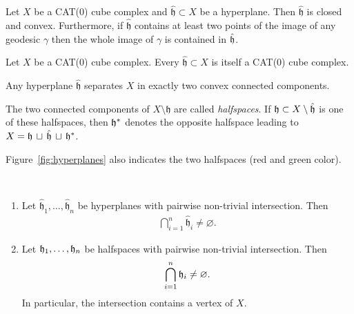\begin{prop}
  Let \(X\) be a CAT(0) cube complex and \(\mathfrak{\hat h} \subset X\) be a hyperplane. Then \(\mathfrak{\hat h}\) is closed and convex. Furthermore, if \(\mathfrak{\hat h}\) contains at least two points of the image of any geodesic \(\gamma\) then the whole image of \(\gamma\) is contained in \(\mathfrak{\hat h}\).
\end{prop}

\begin{cor}
  Let \(X\) be a CAT(0) cube complex. Every \(\mathfrak{\hat h} \subset X\) is itself a CAT(0) cube complex.
\end{cor}

\begin{thm}
  Any hyperplane \(\mathfrak{\hat h}\) separates \(X\) in exactly two convex connected components.
\end{thm}

\begin{defin}[Halfspaces]
  The two connected components of \(X \setminus \mathfrak{h}\) are called \emph{halfspaces}. If \(\mathfrak{h} \subset X \setminus \mathfrak{\hat h}\) is one of these halfspaces, then \(\mathfrak{h}^\ast\) denotes the opposite halfspace leading to \(X = \mathfrak{h}\, \sqcup\, \mathfrak{\hat h}\, \sqcup\, \mathfrak{h}^\ast \).
\end{defin}

\begin{bsp}
  Figure~\ref{fig:hyperplanes} also indicates the two halfspaces (red and green color).
\end{bsp}

\begin{thm}~\vspace{-6pt}
  \label{thm:common-intersection}
  \begin{enumerate} 
  \item Let \(\mathfrak{\hat h}_1, \dots, \mathfrak{\hat h}_n\) be hyperplanes with pairwise non-trivial intersection. Then
    \begin{align*}
      \bigcap_{i=1}^n \mathfrak{\hat h}_i \neq \varnothing.
    \end{align*}
  \item Let \(\mathfrak{h}_1, \dots, \mathfrak{h}_n\) be halfspaces with pairwise non-trivial intersection. Then
    \begin{align*}
      \bigcap_{i=1}^n \mathfrak{h}_i \neq \varnothing.
    \end{align*}
    In particular, the intersection contains a vertex of \(X\).
  \end{enumerate}
\end{thm}

